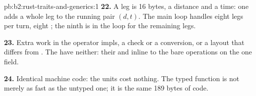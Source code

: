 \begin{solution}{pb:b2:rust-traits-and-generics:1}
\textbf{22.} A leg is 16 bytes, a distance and a time: one  adds a whole leg to the running pair $(d,
t)$. The main loop handles eight legs per turn, eight ; the ninth is in the loop for the remaining legs.

\textbf{23.} Extra work in the operator impls, a check or a conversion, or a layout that differs from .
The  have neither: their  and  inline to the bare operations on the one field.

\textbf{24.} Identical machine code: the units cost nothing. The typed function is not merely as fast as the untyped
one; it is the same 189 bytes of code.
\end{solution}
